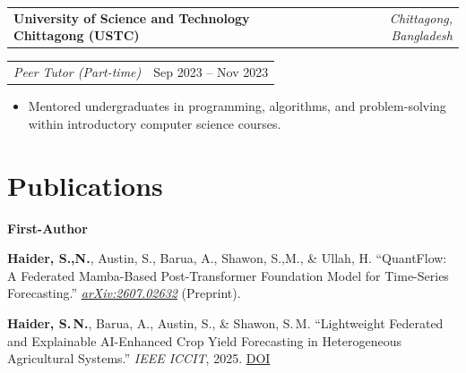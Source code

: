 \documentclass[10pt]{article}
\makeatletter
\newcommand{\entry}[2]{%
  \noindent\begin{tabularx}{\linewidth}{@{}X r@{}}
    \textbf{#1} & \textit{\small #2}
  \end{tabularx}\vspace{-1pt}
}
\newcommand{\subentry}[2]{%
  \noindent\begin{tabularx}{\linewidth}{@{}X r@{}}
    \textit{\small #1} & {\small #2}
  \end{tabularx}\vspace{1pt}
}
\makeatother
\begin{document}
\entry{University of Science and Technology Chittagong (USTC)}{Chittagong, Bangladesh}
\subentry{Peer Tutor (Part-time)}{Sep 2023 -- Nov 2023}
\begin{itemize}
  \item Mentored undergraduates in programming, algorithms, and problem-solving within introductory computer science courses.
\end{itemize}

\section{Publications}
\vspace{2pt}
\textbf{\small First-Author}
\vspace{2pt}
\begin{enumerate}[leftmargin=18pt, itemsep=2pt, topsep=2pt, label={[\arabic*]}]
\item \textbf{Haider, S.,N.}, Austin, S., Barua, A., Shawon, S.,M., \& Ullah, H. ``QuantFlow: A Federated Mamba-Based Post-Transformer Foundation Model for Time-Series Forecasting.'' \textit{\href{https://arxiv.org/abs/2607.02632}{arXiv:2607.02632}} (Preprint).
  \item \textbf{Haider, S.\,N.}, Barua, A., Austin, S., \& Shawon, S.\,M. ``Lightweight Federated and Explainable AI-Enhanced Crop Yield Forecasting in Heterogeneous Agricultural Systems.'' \textit{IEEE ICCIT}, 2025. \href{https://doi.org/10.1109/ICCIT68739.2025.11491605}{DOI}
\end{enumerate}
\end{document}
